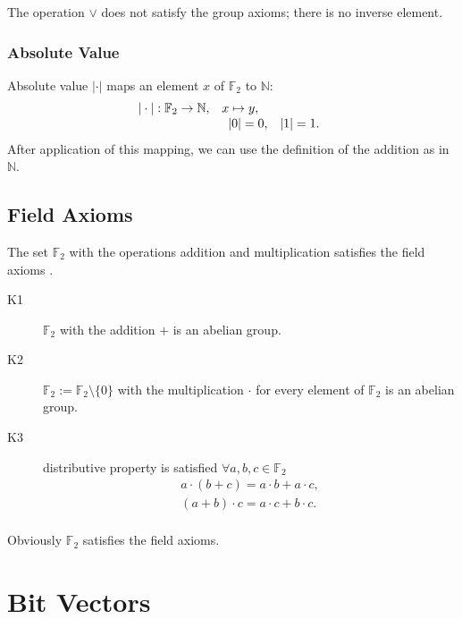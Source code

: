\documentclass[a4paper]{article}
\newcommand{\BF}{\mathbb{F}}
\newcommand{\BN}{\mathbb{N}}
\newcommand{\0}{\mathbf{0}}
\newcommand{\1}{\mathbf{1}}
\begin{document}
The operation $\vee$ does not satisfy the group axioms; there is no inverse element.

\subsubsection{Absolute Value}
Absolute value $| \cdot |$ maps an element $x$ of $\BF_2$ to $\BN$:
\begin{equation}
\begin{array}{ll}
	| \cdot | : \BF_2 \rightarrow \BN, & x \mapsto y, \\
& \begin{array}{l l l l}
| 0 | = 0, & | 1  | = 1. \\
\end{array}
\end{array}
\label{def:value}
\end{equation}
After application of this mapping, we can use the definition of the addition as in $\BN$.

\subsection{Field Axioms}

The set $\BF_2$ with the operations addition and multiplication satisfies the field axioms \cite{Fischer2020, Hill2004}.
\begin{description}
\item[K1] $\BF_2$ with the addition $+$ is an abelian group.
\item[K2] $\BF_2 := \BF_2\setminus \{0\}$ with the multiplication $\cdot$ for every element of $\BF_2$ is an abelian group.
\item[K3] distributive property \cite{Axler2024, wikipedia_en_2025_DistributiveProperty} is satisfied $\forall a, b, c \in \BF_2$
\begin{equation}
\begin{array}{c}
a \cdot (b + c) = a \cdot b + a \cdot c, \\
(a + b) \cdot c = a \cdot c + b \cdot c. \\
\end{array}
\end{equation}
\end{description}
Obviously $\BF_2$ satisfies the field axioms.

\section{Bit Vectors}
\end{document}
